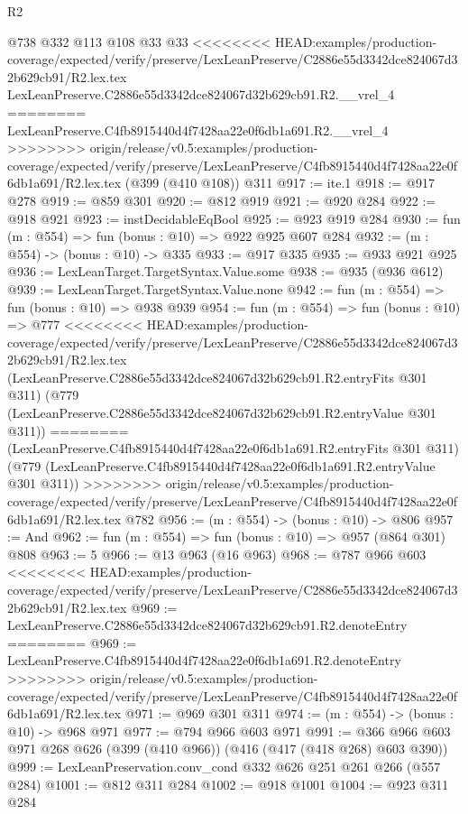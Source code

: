 \begin{lexlean}{R2}
\begin{coremodule}
{{{{{{{{{{{{{{{{{{{{{{    @738
    @332
    @113
    @108
    @33
    @33
<<<<<<<< HEAD:examples/production-coverage/expected/verify/preserve/LexLeanPreserve/C2886e55d3342dce824067d32b629cb91/R2.lex.tex
    LexLeanPreserve.C2886e55d3342dce824067d32b629cb91.R2.__vrel_4
========
    LexLeanPreserve.C4fb8915440d4f7428aa22e0f6db1a691.R2.__vrel_4
>>>>>>>> origin/release/v0.5:examples/production-coverage/expected/verify/preserve/LexLeanPreserve/C4fb8915440d4f7428aa22e0f6db1a691/R2.lex.tex
    (@399 (@410 @108))
    @311
@917 := ite.{1}
@918 := @917 @278
@919 := @859 @301
@920 := @812 @919
@921 := @920 @284
@922 := @918 @921
@923 := instDecidableEqBool
@925 := @923 @919 @284
@930 := fun (m : @554) => fun (bonus : @10) => @922 @925 @607 @284
@932 := (m : @554) -> (bonus : @10) -> @335
@933 := @917 @335
@935 := @933 @921 @925
@936 := LexLeanTarget.TargetSyntax.Value.some
@938 := @935 (@936 @612)
@939 := LexLeanTarget.TargetSyntax.Value.none
@942 := fun (m : @554) => fun (bonus : @10) => @938 @939
@954 := fun (m : @554) =>
  fun (bonus : @10) =>
  @777
<<<<<<<< HEAD:examples/production-coverage/expected/verify/preserve/LexLeanPreserve/C2886e55d3342dce824067d32b629cb91/R2.lex.tex
    (LexLeanPreserve.C2886e55d3342dce824067d32b629cb91.R2.entryFits @301 @311)
    (@779 (LexLeanPreserve.C2886e55d3342dce824067d32b629cb91.R2.entryValue @301 @311))
========
    (LexLeanPreserve.C4fb8915440d4f7428aa22e0f6db1a691.R2.entryFits @301 @311)
    (@779 (LexLeanPreserve.C4fb8915440d4f7428aa22e0f6db1a691.R2.entryValue @301 @311))
>>>>>>>> origin/release/v0.5:examples/production-coverage/expected/verify/preserve/LexLeanPreserve/C4fb8915440d4f7428aa22e0f6db1a691/R2.lex.tex
    @782
@956 := (m : @554) -> (bonus : @10) -> @806
@957 := And
@962 := fun (m : @554) => fun (bonus : @10) => @957 (@864 @301) @808
@963 := 5
@966 := @13 @963 (@16 @963)
@968 := @787 @966 @603
<<<<<<<< HEAD:examples/production-coverage/expected/verify/preserve/LexLeanPreserve/C2886e55d3342dce824067d32b629cb91/R2.lex.tex
@969 := LexLeanPreserve.C2886e55d3342dce824067d32b629cb91.R2.denoteEntry
========
@969 := LexLeanPreserve.C4fb8915440d4f7428aa22e0f6db1a691.R2.denoteEntry
>>>>>>>> origin/release/v0.5:examples/production-coverage/expected/verify/preserve/LexLeanPreserve/C4fb8915440d4f7428aa22e0f6db1a691/R2.lex.tex
@971 := @969 @301 @311
@974 := (m : @554) -> (bonus : @10) -> @968 @971
@977 := @794 @966 @603 @971
@991 := @366 @966 @603 @971 @268 @626 (@399 (@410 @966)) (@416 (@417 (@418 @268) @603 @390))
@999 := LexLeanPreservation.conv_cond @332 @626 @251 @261 @266 (@557 @284)
@1001 := @812 @311 @284
@1002 := @918 @1001
@1004 := @923 @311 @284
}}}}}}}}}}}}}}}}}}}}}}
\end{coremodule}
\end{lexlean}
